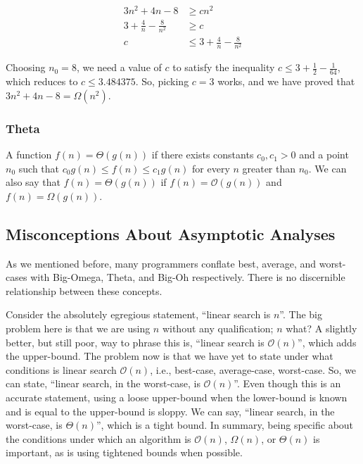 \begin{align*}
  3n^2 + 4n - 8 &\geq cn^2\\
  3 + \frac{4}{n} - \frac{8}{n^2} &\geq c\\
  c &\leq 3 + \frac{4}{n} - \frac{8}{n^2}
\end{align*}

Choosing $n_0 = 8$, we need a value of $c$ to satisfy the inequality $c \leq 3 + \frac{1}{2} - \frac{1}{64}$, which reduces to $c \leq 3.484375$. So, picking $c = 3$ works, and we have proved that $3n^2 + 4n - 8 = \Omega(n^2)$.

\subsubsection*{Theta}
A function $f(n) = \Theta(g(n))$ if there exists constants $c_0, c_1 > 0$ and a point $n_0$ such that $c_0g(n) \leq f(n) \leq c_1g(n)$ for every $n$ greater than $n_0$. We can also say that $f(n) = \Theta(g(n))$ if $f(n) = \mathcal{O}(g(n))$ and $f(n) = \Omega(g(n))$.

\noindent{}

\subsection*{Misconceptions About Asymptotic Analyses}

As we mentioned before, many programmers conflate best, average, and worst-cases with Big-Omega, Theta, and Big-Oh respectively. There is no discernible relationship between these concepts.

\example Consider the absolutely egregious statement, ``linear search is $n$''. The big problem here is that we are using $n$ without any qualification; $n$ what? A slightly better, but still poor, way to phrase this is, ``linear search is $\mathcal{O}(n)$'', which adds the upper-bound. The problem now is that we have yet to state under what conditions is linear search $\mathcal{O}(n)$, i.e., best-case, average-case, worst-case. So, we can state, ``linear search, in the worst-case, is $\mathcal{O}(n)$''. Even though this is an accurate statement, using a loose upper-bound when the lower-bound is known and is equal to the upper-bound is sloppy. We can say, ``linear search, in the worst-case, is $\Theta(n)$'', which is a tight bound. In summary, being specific about the conditions under which an algorithm is $\mathcal{O}(n)$, $\Omega(n)$, or $\Theta(n)$ is important, as is using tightened bounds when possible.

